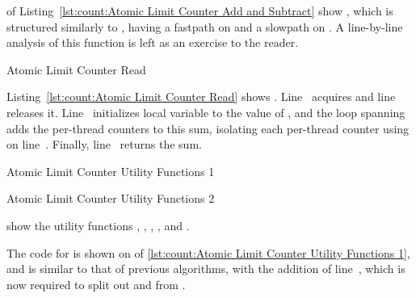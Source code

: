 \begin{fcvref}
 of
Listing~\ref{lst:count:Atomic Limit Counter Add and Subtract}
show , which is structured similarly to
, having a fastpath on
 and a slowpath on
.
A line-by-line analysis of this function is left as an exercise to
the reader.
\end{fcvref}

\begin{listing}

\caption{Atomic Limit Counter Read}
\label{lst:count:Atomic Limit Counter Read}
\end{listing}

\begin{fcvref}
Listing~\ref{lst:count:Atomic Limit Counter Read} shows .
Line~ acquires  and
line~ releases it.
Line~ initializes local variable  to the value of
, and the loop spanning
 adds the
per-thread counters to this sum, isolating each per-thread counter
using  on line~.
Finally, line~ returns the sum.
\end{fcvref}

\begin{listing}

\caption{Atomic Limit Counter Utility Functions 1}
\label{lst:count:Atomic Limit Counter Utility Functions 1}
\end{listing}

\begin{listing}

\caption{Atomic Limit Counter Utility Functions 2}
\label{lst:count:Atomic Limit Counter Utility Functions 2}
\end{listing}

show the utility functions
,
,
,
, and
.
\begin{fcvref}
The code for  is shown on
of \cref{lst:count:Atomic Limit Counter Utility Functions 1}, and
is similar to that of previous algorithms, with the addition of
line~, which is now required to split out  and
 from .
\end{fcvref}

